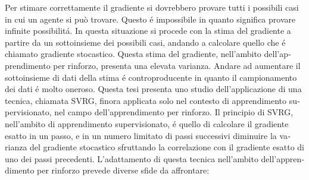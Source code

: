 \begin{otherlanguage}{italian}
Per stimare correttamente il gradiente si dovrebbero provare tutti i possibili casi in cui un agente si può trovare. Questo \'e impossibile in quanto significa provare infinite possibilit\'a.
In questa situazione si procede con la stima del gradiente a partire da un sottoinsieme dei possibili casi, andando a calcolare quello che \'e chiamato gradiente stocastico.
Questa stima del gradiente, nell'ambito dell'apprendimento per rinforzo, presenta una elevata varianza. 
Andare ad aumentare il sottoinsieme di dati della stima \'e controproducente in quanto il campionamento dei dati \'e molto oneroso.\newline
Questa tesi presenta uno studio dell'applicazione di una tecnica, chiamata SVRG, finora applicata solo nel contesto di apprendimento supervisionato, nel campo dell'apprendimento per rinforzo. 
Il principio di SVRG, nell'ambito di apprendimento supervisionato, \'e quello di calcolare il gradiente esatto in un passo, e in un numero limitato di passi successivi diminuire la varianza del gradiente stocastico sfruttando la correlazione con il gradiente esatto di uno dei passi precedenti.\newline
L'adattamento di questa tecnica nell'ambito dell'apprendimento per rinforzo prevede diverse sfide da affrontare:
\end{otherlanguage}

\endgroup

